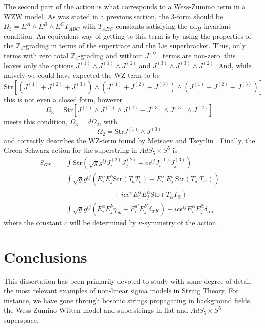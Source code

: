 \documentclass[a4paper,12pt]{article}
\numberwithin{equation}{section}
\numberwithin{thm}{section}
\numberwithin{exm}{section}
\newcommand{\ad}{\mathrm{ad}}
\newcommand{\str}{\mathrm{Str}}
\newcommand{\Z}{{\mathbb Z}}
\newcommand{\we}{{\wedge}}
\newcommand{\ads}{{AdS_5\times S^5}}
\newcommand{\<}{{\langle}}
\renewcommand{\>}{{\rangle}}
\renewcommand{\a}{{\alpha}}
\newcommand{\ah}{{\widehat\alpha}}
\renewcommand{\d}{{\delta}}
\newcommand{\e}{{\epsilon}}
\renewcommand{\k}{{\kappa}}
\newcommand{\Om}{{\Omega}}
\begin{document}
The second part of the action is what corresponds to a Wess-Zumino term in a WZW model. As was stated in a previous section, the 3-form should be $\Om_3 = E^A \we E^B \we E^C T_{ABC}$ with $T_{ABC}$ constants satisfying the $\ad_H$-invariant condition. An equivalent way of getting to this term is by using the properties of the $\Z_4$-grading in terms of the supertrace and the Lie superbracket. Thus, only terms with zero total $\Z_4$-grading and without $J^{(0)}$ terms are non-zero, this leaves only the options $J^{(1)}\we J^{(1)}\we J^{(2)}$ and $J^{(3)}\we J^{(3)}\we J^{(2)}$. And, while naively we could have expected the WZ-term to be
	\begin{equation}
	\str[(J^{(1)}+J^{(2)}+J^{(3)})\we (J^{(1)}+J^{(2)}+J^{(3)})\we (J^{(1)}+J^{(2)}+J^{(3)})]
	\end{equation}
this is not even a closed form, however
	\begin{equation}
	\Om_3 = \str[J^{(1)}\we J^{(1)}\we J^{(2)} - J^{(3)}\we J^{(3)}\we J^{(2)}]
	\end{equation}
meets this condition, $\Om_3 = d\Om_2$, with
	\begin{equation}
	\Om_2 = \str J^{(1)}\we J^{(3)}
	\end{equation}
and correctly describes the WZ-term found by Metsaev and Tseytlin \cite{Metsaev1998}. Finally, the Green-Schwarz action for the superstring in $\ads$ is
	\begin{align}
	S_{GS} & = \int \str(\sqrt{g} g^{ij} J^{(2)}_i J^{(2)}_j + c \e^{ij} J^{(1)}_i J^{(3)}_j) \nonumber \\
	& = \int \sqrt{g} g^{ij} \left(E^a_i E^b_j \str (T_a T_b) + E^{a'}_i E^{b'}_j \str(T_{a'}T_{b'})\right) \nonumber \\
	& \qquad\qquad\qquad\qquad + i c \e^{ij} E^\a_i E^\ah_j \str(T_\a T_\ah) \nonumber \\
	& = \int \sqrt{g} g^{ij} \left(E^a_i E^b_j \eta_{ab} + E^{a'}_i E^{b'}_j \d_{a'b'}\right) + i c \e^{ij} E^\a_i E^\ah_j \d_{\a\ah}
	\end{align}
where the constant $c$ will be determined by $\k$-symmetry of the action.

\newpage



\section{Conclusions}
This dissertation has been primarily devoted to study with some degree of detail the most relevant examples of non-linear sigma models in String Theory. For instance, we have gone through bosonic strings propagating in background fields, the Wess-Zumino-Witten model and superstrings in flat and $\ads$ superspace.
\end{document}
